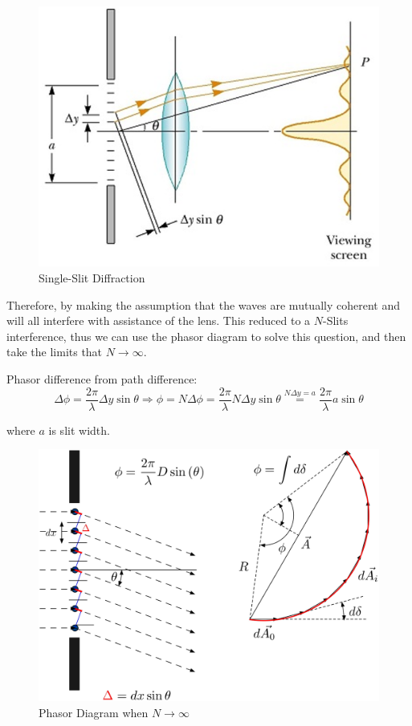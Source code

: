 \documentclass[UTF8]{book}
\begin{document}
\begin{figure}[H]
\centering
\label{fig:Single-Slit Diffraction}
\includegraphics[scale=0.6]{Figure/25.PNG}
\caption{Single-Slit Diffraction}
\end{figure}

Therefore, by making the assumption that the waves are mutually coherent and will all interfere with assistance of the lens. This reduced to a $N$-Slits interference, thus we can use the phasor diagram to solve this question, and then take the limits that $N\to \infty$.

Phasor difference from path difference:
\[\Delta \phi =\frac{2\pi }{\lambda }\Delta y\sin \theta \Rightarrow \phi =N\Delta \phi =\frac{2\pi }{\lambda }N\Delta y\sin \theta \overset{N\Delta y=a}{=}\frac{2\pi }{\lambda }a\sin \theta \]

where $a$ is slit width.

\begin{figure}[H]
\centering
\label{fig:Single-Slit Diffraction1}
\includegraphics[scale=0.4]{Figure/Phasor_3.PNG}
\caption{Phasor Diagram when $N\to \infty$}
\end{figure}
\end{document}
